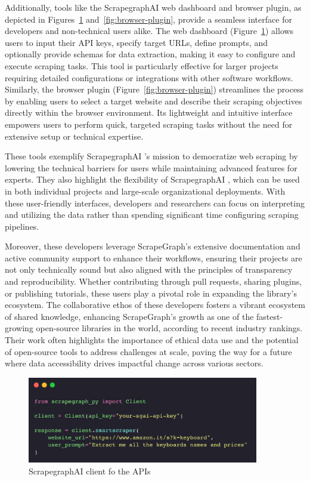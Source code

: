 Additionally, tools like the ScrapegraphAI web dashboard and browser plugin, as depicted in Figures~\ref{fig:web-dashboard} and~\ref{fig:browser-plugin}, provide a seamless interface for developers and non-technical users alike. The web dashboard (Figure~\ref{fig:web-dashboard}) allows users to input their API keys, specify target URLs, define prompts, and optionally provide schemas for data extraction, making it easy to configure and execute scraping tasks. This tool is particularly effective for larger projects requiring detailed configurations or integrations with other software workflows. Similarly, the browser plugin (Figure~\ref{fig:browser-plugin}) streamlines the process by enabling users to select a target website and describe their scraping objectives directly within the browser environment. Its lightweight and intuitive interface empowers users to perform quick, targeted scraping tasks without the need for extensive setup or technical expertise.

These tools exemplify ScrapegraphAI 's mission to democratize web scraping by lowering the technical barriers for users while maintaining advanced features for experts. They also highlight the flexibility of ScrapegraphAI , which can be used in both individual projects and large-scale organizational deployments. With these user-friendly interfaces, developers and researchers can focus on interpreting and utilizing the data rather than spending significant time configuring scraping pipelines.

Moreover, these developers leverage ScrapeGraph’s extensive documentation and active community support to enhance their workflows, ensuring their projects are not only technically sound but also aligned with the principles of transparency and reproducibility. Whether contributing through pull requests, sharing plugins, or publishing tutorials, these users play a pivotal role in expanding the library’s ecosystem. The collaborative ethos of these developers fosters a vibrant ecosystem of shared knowledge, enhancing ScrapeGraph's growth as one of the fastest-growing open-source libraries in the world, according to recent industry rankings. Their work often highlights the importance of ethical data use and the potential of open-source tools to address challenges at scale, paving the way for a future where data accessibility drives impactful change across various sectors.



\begin{figure}[h!]
    \centering
    \includegraphics[width=0.9\textwidth]{Assets/API.png}
    \caption{ScrapegraphAI client fo the APIs}
    \label{fig:web-dashboard}
\end{figure}

